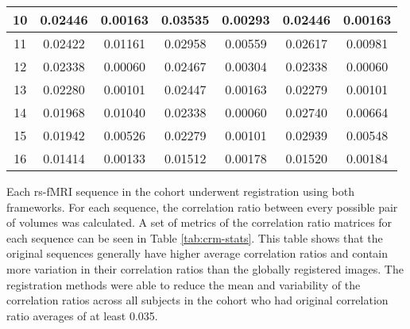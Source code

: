\begin{table}[t]
\begin{tabular}{|c|c|c|c|c|c|c|}
10                              & 0.02446       & 0.00163                                                                & 0.03535       & 0.00293                                                                & 0.02446       & 0.00163                                                                \\ \hline
11                              & 0.02422       & 0.01161                                                                & 0.02958       & 0.00559                                                                & 0.02617       & 0.00981                                                                \\ \hline
12                              & 0.02338       & 0.00060                                                                & 0.02467       & 0.00304                                                                & 0.02338       & 0.00060                                                                \\ \hline
13                              & 0.02280       & 0.00101                                                                & 0.02447       & 0.00163                                                                & 0.02279       & 0.00101                                                                \\ \hline
14                              & 0.01968       & 0.01040                                                                & 0.02338       & 0.00060                                                                & 0.02740       & 0.00664                                                                \\ \hline
15                              & 0.01942       & 0.00526                                                                & 0.02279       & 0.00101                                                                & 0.02939       & 0.00548                                                                \\ \hline
16                              & 0.01414       & 0.00133                                                                & 0.01512       & 0.00178                                                                & 0.01520       & 0.00184                                                                \\ \hline
\end{tabular}
\end{table}

Each rs-fMRI sequence in the cohort underwent registration using both frameworks. For each sequence, the correlation ratio between every possible pair of volumes was calculated. A set of metrics of the correlation ratio matrices for each sequence can be seen in Table \ref{tab:crm-stats}. This table shows that the original sequences generally have higher average correlation ratios and contain more variation in their correlation ratios than the globally registered images. The registration methods were able to reduce the mean and variability of the correlation ratios across all subjects in the cohort who had original correlation ratio averages of at least 0.035.

